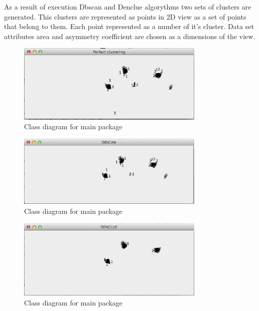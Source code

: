 \documentclass[12pt, a4paper, notitlepage, oneside]{article}
\begin{document}
As a result of execution Dbscan and Denclue algorythms two sets of clusters are generated. This clusters are represented as points in 2D view as a set of points that belong to them. Each point represented as a number of it’s cluster. Data set attributes area and asymmetry coefficient are chosen as a dimensions of the view.

\begin{figure}[!ht]
 	\centering
	\includegraphics[width=0.8\textwidth]{images/perfect.png}
 	\caption[]
	{Class diagram for main package}
	\end{figure}

\begin{figure}[!ht]
 	\centering
	\includegraphics[width=0.8\textwidth]{images/dbscan.png}
 	\caption[]
	{Class diagram for main package}
	\end{figure}

\begin{figure}[!ht]
 	\centering
	\includegraphics[width=0.8\textwidth]{images/denclue.png}
 	\caption[]
	{Class diagram for main package}
	\end{figure}







\end{document}
